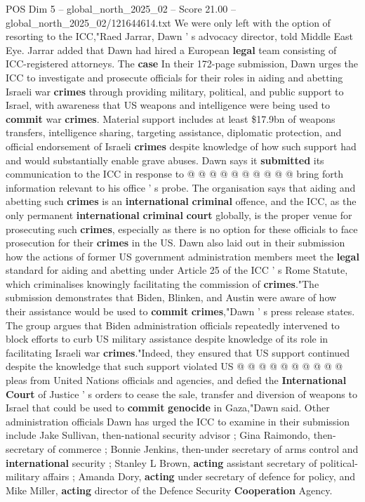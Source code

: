 \begin{textsample}{POS Dim 5 – global\_north\_2025\_02 – Score 21.00 – global\_north\_2025\_02/121644614.txt}
We were only left with the option of resorting to the ICC,"Raed Jarrar, Dawn ' s advocacy director, told Middle East Eye.
Jarrar added that Dawn had hired a European \textbf{legal} team consisting of ICC-registered attorneys.
The \textbf{case} In their 172-page submission, Dawn urges the ICC to investigate and prosecute officials for their roles in aiding and abetting Israeli war \textbf{crimes} through providing military, political, and public support to Israel, with awareness that US weapons and intelligence were being used to \textbf{commit} war \textbf{crimes}.
Material support includes at least \$17.9bn of weapons transfers, intelligence sharing, targeting assistance, diplomatic protection, and official endorsement of Israeli \textbf{crimes} despite knowledge of how such support had and would substantially enable grave abuses.
Dawn says it \textbf{submitted} its communication to the ICC in response to @ @ @ @ @ @ @ @ @ @ bring forth information relevant to his office ' s probe.
The organisation says that aiding and abetting such \textbf{crimes} is an \textbf{international} \textbf{criminal} offence, and the ICC, as the only permanent \textbf{international} \textbf{criminal} \textbf{court} globally, is the proper venue for prosecuting such \textbf{crimes}, especially as there is no option for these officials to face prosecution for their \textbf{crimes} in the US.
Dawn also laid out in their submission how the actions of former US government administration members meet the \textbf{legal} standard for aiding and abetting under Article 25 of the ICC ' s Rome Statute, which criminalises knowingly facilitating the commission of \textbf{crimes}."The submission demonstrates that Biden, Blinken, and Austin were aware of how their assistance would be used to \textbf{commit} \textbf{crimes},"Dawn ' s press release states.
The group argues that Biden administration officials repeatedly intervened to block efforts to curb US military assistance despite knowledge of its role in facilitating Israeli war \textbf{crimes}."Indeed, they ensured that US support continued despite the knowledge that such support violated US @ @ @ @ @ @ @ @ @ @ pleas from United Nations officials and agencies, and defied the \textbf{International} \textbf{Court} of Justice ' s orders to cease the sale, transfer and diversion of weapons to Israel that could be used to \textbf{commit} \textbf{genocide} in Gaza,"Dawn said.
Other administration officials Dawn has urged the ICC to examine in their submission include Jake Sullivan, then-national security advisor ; Gina Raimondo, then-secretary of commerce ; Bonnie Jenkins, then-under secretary of arms control and \textbf{international} security ; Stanley L Brown, \textbf{acting} assistant secretary of political-military affairs ; Amanda Dory, \textbf{acting} under secretary of defence for policy, and Mike Miller, \textbf{acting} director of the Defence Security \textbf{Cooperation} Agency.

\end{textsample}
